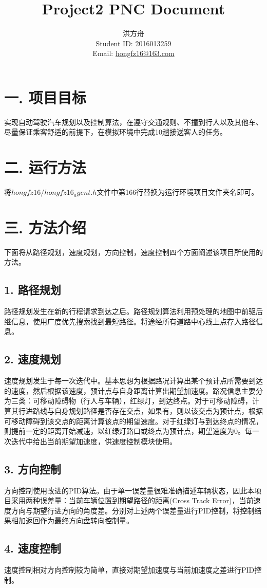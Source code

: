 \documentclass[12pt]{article}
\title{Project2 PNC Document}
\author{洪方舟\\Student ID: 2016013259\\Email: \href{mailto:hongfz16@163.com}{hongfz16@163.com}}
\begin{document}
  \maketitle
  \section*{一. 项目目标}
  	实现自动驾驶汽车规划以及控制算法，在遵守交通规则、不撞到行人以及其他车、尽量保证乘客舒适的前提下，在模拟环境中完成10趟接送客人的任务。
  \section*{二. 运行方法}
  	将$hongfz16/hongfz16_agent.h$文件中第166行替换为运行环境项目文件夹名即可。
  \section*{三. 方法介绍}
	下面将从路径规划，速度规划，方向控制，速度控制四个方面阐述该项目所使用的方法。
	\subsection*{1. 路径规划}
		路径规划发生在新的行程请求到达之后。路径规划算法利用预处理的地图中前驱后继信息，使用广度优先搜索找到最短路径。将途经所有道路中心线上点存入路径信息。
	\subsection*{2. 速度规划}
		速度规划发生于每一次迭代中。基本思想为根据路况计算出某个预计点所需要到达的速度，然后根据该速度，预计点与自身距离计算出期望加速度。路况信息主要分为三类：可移动障碍物（行人与车辆），红绿灯，到达终点。对于可移动障碍，计算其行进路线与自身规划路径是否存在交点，如果有，则以该交点为预计点，根据可移动障碍到该交点的距离计算该点的期望速度。对于红绿灯与到达终点的情况，则提前一定的距离开始减速，以红绿灯路口或终点为预计点，期望速度为0。每一次迭代中给出当前期望加速度，供速度控制模块使用。
	\subsection*{3. 方向控制}
		方向控制使用改进的PID算法。由于单一误差量很难准确描述车辆状态，因此本项目采用两种误差量：当前车辆位置到期望路径的距离(Cross Track Error)，当前速度方向与期望行进方向的角度差。分别对上述两个误差量进行PID控制，将控制结果相加返回作为最终方向盘转向控制量。
	\subsection*{4. 速度控制}
		速度控制相对方向控制较为简单，直接对期望加速度与当前加速度之差进行PID控制。
\end{document}
